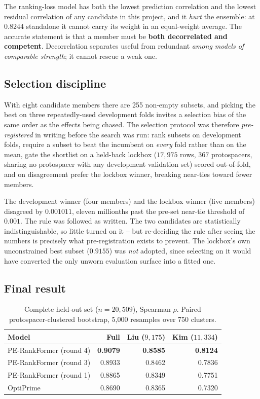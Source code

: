 \documentclass[11pt]{article}
\begin{document}
The ranking-loss model has both the lowest prediction correlation and the lowest
residual correlation of any candidate in this project, and it \emph{hurt} the
ensemble: at $0.8244$ standalone it cannot carry its weight in an equal-weight
average. The accurate statement is that a member must be \textbf{both decorrelated
and competent}. Decorrelation separates useful from redundant \emph{among models of
comparable strength}; it cannot rescue a weak one.

\subsection{Selection discipline}

With eight candidate members there are 255 non-empty subsets, and picking the best
on three repeatedly-used development folds invites a selection bias of the same
order as the effects being chased. The selection protocol was therefore
\emph{pre-registered} in writing before the search was run: rank subsets on
development folds, require a subset to beat the incumbent on \emph{every} fold
rather than on the mean, gate the shortlist on a held-back lockbox
($17{,}975$ rows, $367$ protospacers, sharing no protospacer with any development
validation set) scored out-of-fold, and on disagreement prefer the lockbox winner,
breaking near-ties toward fewer members.

The development winner (four members) and the lockbox winner (five members)
disagreed by $0.001011$, eleven millionths past the pre-set near-tie threshold of
$0.001$. The rule was followed as written. The two candidates are statistically
indistinguishable, so little turned on it -- but re-deciding the rule after seeing
the numbers is precisely what pre-registration exists to prevent. The lockbox's own
unconstrained best subset ($0.9155$) was \emph{not} adopted, since selecting on it
would have converted the only unworn evaluation surface into a fitted one.

\subsection{Final result}

\begin{table}[H]
\centering
\caption{Complete held-out set ($n=20{,}509$), Spearman $\rho$. Paired
protospacer-clustered bootstrap, 5{,}000 resamples over 750 clusters.}
\label{tab:final}
\begin{tabular}{lrrr}
\toprule
Model & Full & Liu ($9{,}175$) & Kim ($11{,}334$) \\
\midrule
PE-RankFormer (round 4) & \textbf{0.9079} & \textbf{0.8585} & \textbf{0.8124} \\
PE-RankFormer (round 3) & 0.8933 & 0.8462 & 0.7836 \\
PE-RankFormer (round 1) & 0.8865 & 0.8349 & 0.7751 \\
OptiPrime & 0.8690 & 0.8365 & 0.7320 \\
\bottomrule
\end{tabular}
\end{table}
\end{document}
